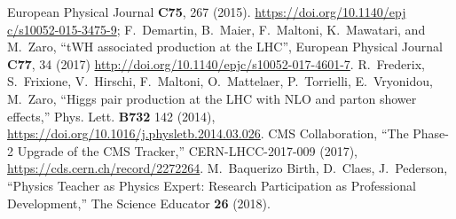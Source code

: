 \begin{thebibliography}{99}
  European Physical Journal {\bf C75}, 267
  (2015). \url{https://doi.org/10.1140/epj c/s10052-015-3475-9};
  F.~Demartin, B.~Maier, F.~Maltoni, K.~Mawatari, and M.~Zaro, ``tWH
  associated production at the LHC'', European Physical Journal {\bf C77}, 34 (2017)
  \url{http://doi.org/10.1140/epjc/s10052-017-4601-7}. 
%
 R.~Frederix, S.~Frixione, V.~Hirschi,
  F.~Maltoni, O.~Mattelaer, P.~Torrielli, E.~Vryonidou, M.~Zaro, ``Higgs
  pair production at the LHC with NLO and parton shower effects,''
  Phys. Lett. {\bf B732} 142 (2014), \url{ https://doi.org/10.1016/j.physletb.2014.03.026}.
%
CMS Collaboration, ``The Phase-2 Upgrade of the CMS Tracker,'' CERN-LHCC-2017-009 (2017),
\url{https://cds.cern.ch/record/2272264}.
%
 M.~Baquerizo Birth, D.~Claes, J.~Pederson, ``Physics Teacher as Physics Expert: Research Participation as Professional Development,''  The Science Educator {\bf 26} (2018).
\end{thebibliography}
